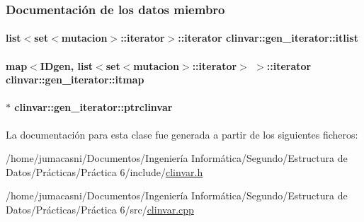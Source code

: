 \subsubsection{Documentación de los datos miembro}
\paragraph[{\texorpdfstring{itlist}{itlist}}]{\setlength{\rightskip}{0pt plus 5cm}list$<$set$<${\bf mutacion}$>$\+::{\bf iterator}$>$\+::{\bf iterator} clinvar\+::gen\+\_\+iterator\+::itlist\hspace{0.3cm}{\ttfamily [private]}}\hypertarget{classclinvar_1_1gen__iterator_ac7a00352d0b59e93fa2ebe33dd217603}{}\label{classclinvar_1_1gen__iterator_ac7a00352d0b59e93fa2ebe33dd217603}
\paragraph[{\texorpdfstring{itmap}{itmap}}]{\setlength{\rightskip}{0pt plus 5cm}map$<${\bf I\+Dgen}, list$<$set$<${\bf mutacion}$>$\+::{\bf iterator}$>$ $>$\+::{\bf iterator} clinvar\+::gen\+\_\+iterator\+::itmap\hspace{0.3cm}{\ttfamily [private]}}\hypertarget{classclinvar_1_1gen__iterator_ad9ce96bf6705b90c9324fc99b45526b6}{}\label{classclinvar_1_1gen__iterator_ad9ce96bf6705b90c9324fc99b45526b6}
\paragraph[{\texorpdfstring{ptrclinvar}{ptrclinvar}}]{$\ast$ clinvar\+::gen\+\_\+iterator\+::ptrclinvar\hspace{0.3cm}{\ttfamily [private]}}\hypertarget{classclinvar_1_1gen__iterator_a18f22bc9255dbaf8e45cd3cee39de910}{}\label{classclinvar_1_1gen__iterator_a18f22bc9255dbaf8e45cd3cee39de910}


La documentación para esta clase fue generada a partir de los siguientes ficheros\+:\begin{DoxyCompactItemize}
\item 
/home/jumacasni/\+Documentos/\+Ingeniería Informática/\+Segundo/\+Estructura de Datos/\+Prácticas/\+Práctica 6/include/\hyperlink{clinvar_8h}{clinvar.\+h}\item 
/home/jumacasni/\+Documentos/\+Ingeniería Informática/\+Segundo/\+Estructura de Datos/\+Prácticas/\+Práctica 6/src/\hyperlink{clinvar_8cpp}{clinvar.\+cpp}\end{DoxyCompactItemize}
